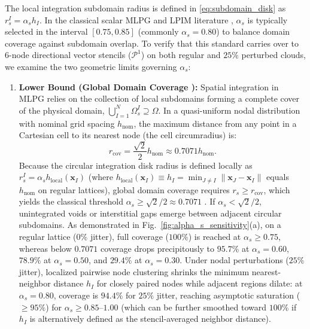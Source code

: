\documentclass[VANCOUVER,Times1COL]{WileyNJD-v5}
\begin{document}
The local integration subdomain radius is defined in \eqref{eq:subdomain_disk} as $r_s^I = \alpha_s h_I$. In the classical scalar MLPG and LPIM literature \cite{atluri2002meshless, liu2009mesh}, $\alpha_s$ is typically selected in the interval $[0.75, 0.85]$ (commonly $\alpha_s = 0.80$) to balance domain coverage against subdomain overlap. To verify that this standard carries over to 6-node directional vector stencils ($\mathcal{P}^1$) on both regular and $25\%$ perturbed clouds, we examine the two geometric limits governing $\alpha_s$:
\begin{enumerate}
    \item \textbf{Lower Bound (Global Domain Coverage \cite{atluri2002meshless, liu2009mesh}):} Spatial integration in MLPG relies on the collection of local subdomains forming a complete cover of the physical domain, $\bigcup_{I=1}^N \Omega_s^I \supseteq \Omega$. In a quasi-uniform nodal distribution with nominal grid spacing $h_{\mathrm{nom}}$, the maximum distance from any point in a Cartesian cell to its nearest node (the cell circumradius) is:
          \begin{equation}
              r_{\mathrm{cov}} = \frac{\sqrt{2}}{2} h_{\mathrm{nom}} \approx 0.7071 h_{\mathrm{nom}}.
              \label{eq:alpha_s_lower_bound}
          \end{equation}
          Because the circular integration disk radius is defined locally as $r_s^I = \alpha_s h_{\mathrm{local}}(\mathbf{x}_I)$ (where $h_{\mathrm{local}}(\mathbf{x}_I) \equiv h_I = \min_{J \ne I} \|\mathbf{x}_J - \mathbf{x}_I\|$ equals $h_{\mathrm{nom}}$ on regular lattices), global domain coverage requires $r_s \ge r_{\mathrm{cov}}$, which yields the classical threshold $\alpha_s \ge \sqrt{2}/2 \approx 0.7071$ \cite{atluri2002meshless, liu2009mesh}. If $\alpha_s < \sqrt{2}/2$, unintegrated voids or interstitial gaps emerge between adjacent circular subdomains. As demonstrated in Fig.~\ref{fig:alpha_s_sensitivity}(a), on a regular lattice ($0\%$ jitter), full coverage ($100\%$) is reached at $\alpha_s \ge 0.75$, whereas below $0.7071$ coverage drops precipitously to $95.7\%$ at $\alpha_s = 0.60$, $78.9\%$ at $\alpha_s = 0.50$, and $29.4\%$ at $\alpha_s = 0.30$. Under nodal perturbations ($25\%$ jitter), localized pairwise node clustering shrinks the minimum nearest-neighbor distance $h_I$ for closely paired nodes while adjacent regions dilate: at $\alpha_s = 0.80$, coverage is $94.4\%$ for $25\%$ jitter, reaching asymptotic saturation ($\ge 95\%$) for $\alpha_s \ge 0.85\text{--}1.00$ (which can be further smoothed toward $100\%$ if $h_I$ is alternatively defined as the stencil-averaged neighbor distance).

\end{enumerate}
\end{document}
